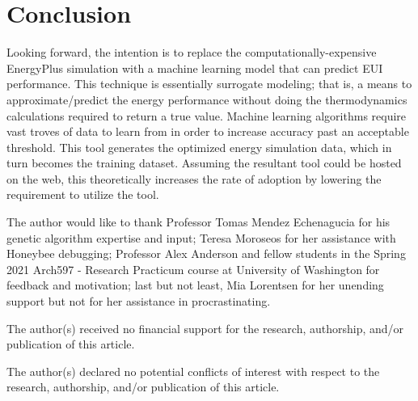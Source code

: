 \documentclass[sagev,times,Royal]{sagej}
\begin{document}
\section{Conclusion}
Looking forward, the intention is to replace the computationally-expensive EnergyPlus simulation with a machine learning model that can predict EUI performance. This technique is essentially  surrogate modeling; that is, a means to approximate/predict the energy performance without doing the thermodynamics calculations required to return a true value. Machine learning algorithms require vast troves of data to learn from in order to increase accuracy past an acceptable threshold. This tool generates the optimized energy simulation data, which in turn becomes the training dataset. Assuming the resultant tool could be hosted on the web, this theoretically increases the rate of adoption by lowering the requirement to utilize the tool. 


\begin{acks}
The author would like to thank Professor Tomas Mendez Echenagucia for his genetic algorithm expertise and input; Teresa Moroseos for her assistance with Honeybee debugging; Professor Alex Anderson and fellow students in the Spring 2021 Arch597 - Research Practicum course at University of Washington for feedback and motivation; last but not least, Mia Lorentsen for her unending support but not for her assistance in procrastinating.
\end{acks}

\begin{funding}
The author(s) received no financial support for the research, authorship, and/or publication of this article.
\end{funding}

\begin{dci}
	The author(s) declared no potential conflicts of interest with respect to the research, authorship, and/or publication of this article.
\end{dci}



\end{document}
